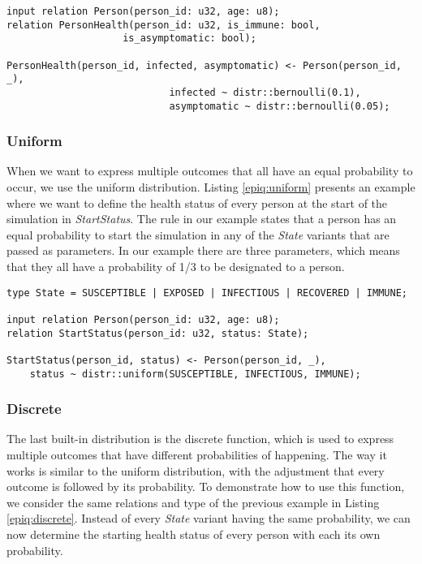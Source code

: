 \begin{lstlisting}[caption={Variable binding.}, label={epiq:variable_binding}]
input relation Person(person_id: u32, age: u8);
relation PersonHealth(person_id: u32, is_immune: bool,
                    is_asymptomatic: bool);

PersonHealth(person_id, infected, asymptomatic) <- Person(person_id, _),
                            infected ~ distr::bernoulli(0.1),
                            asymptomatic ~ distr::bernoulli(0.05);
\end{lstlisting}

\subsubsection{Uniform}
When we want to express multiple outcomes that all have an equal probability to occur, we use the uniform distribution. Listing \ref{epiq:uniform} presents an example where we want to define the health status of every person at the start of the simulation in \textit{StartStatus}. The rule in our example states that a person has an equal probability to start the simulation in any of the \textit{State} variants that are passed as parameters. In our example there are three parameters, which means that they all have a probability of 1/3 to be designated to a person.

\begin{lstlisting}[caption={Uniform distribution.}, label={epiq:uniform}]
type State = SUSCEPTIBLE | EXPOSED | INFECTIOUS | RECOVERED | IMMUNE;

input relation Person(person_id: u32, age: u8);
relation StartStatus(person_id: u32, status: State);

StartStatus(person_id, status) <- Person(person_id, _),
    status ~ distr::uniform(SUSCEPTIBLE, INFECTIOUS, IMMUNE);
\end{lstlisting}

\subsubsection{Discrete}
The last built-in distribution is the discrete function, which is used to express multiple outcomes that have different probabilities of happening. The way it works is similar to the uniform distribution, with the adjustment that every outcome is followed by its probability. To demonstrate how to use this function, we consider the same relations and type of the previous example in Listing \ref{epiq:discrete}. Instead of every \textit{State} variant having the same probability, we can now determine the starting health status of every person with each its own probability. 

